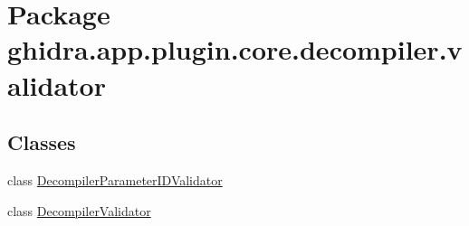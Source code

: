 \hypertarget{namespaceghidra_1_1app_1_1plugin_1_1core_1_1decompiler_1_1validator}{}\section{Package ghidra.\+app.\+plugin.\+core.\+decompiler.\+validator}
\label{namespaceghidra_1_1app_1_1plugin_1_1core_1_1decompiler_1_1validator}
\subsection*{Classes}
\begin{DoxyCompactItemize}
\item 
class \mbox{\hyperlink{classghidra_1_1app_1_1plugin_1_1core_1_1decompiler_1_1validator_1_1_decompiler_parameter_i_d_validator}{Decompiler\+Parameter\+I\+D\+Validator}}
\item 
class \mbox{\hyperlink{classghidra_1_1app_1_1plugin_1_1core_1_1decompiler_1_1validator_1_1_decompiler_validator}{Decompiler\+Validator}}
\end{DoxyCompactItemize}

